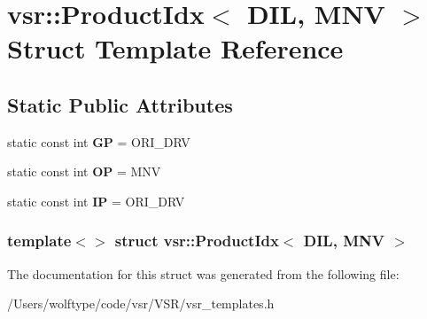 \hypertarget{structvsr_1_1_product_idx_3_01_d_i_l_00_01_m_n_v_01_4}{\section{vsr\-:\-:Product\-Idx$<$ D\-I\-L, M\-N\-V $>$ Struct Template Reference}
\label{structvsr_1_1_product_idx_3_01_d_i_l_00_01_m_n_v_01_4}
}
\subsection*{Static Public Attributes}
\begin{DoxyCompactItemize}
\item 
\hypertarget{structvsr_1_1_product_idx_3_01_d_i_l_00_01_m_n_v_01_4_a890b97ff0f5934e629fce65a089faeec}{static const int {\bfseries G\-P} = O\-R\-I\-\_\-\-D\-R\-V}\label{structvsr_1_1_product_idx_3_01_d_i_l_00_01_m_n_v_01_4_a890b97ff0f5934e629fce65a089faeec}

\item 
\hypertarget{structvsr_1_1_product_idx_3_01_d_i_l_00_01_m_n_v_01_4_a7eed7ef5671885e43fdc49044ec17a76}{static const int {\bfseries O\-P} = M\-N\-V}\label{structvsr_1_1_product_idx_3_01_d_i_l_00_01_m_n_v_01_4_a7eed7ef5671885e43fdc49044ec17a76}

\item 
\hypertarget{structvsr_1_1_product_idx_3_01_d_i_l_00_01_m_n_v_01_4_adcc879abeb4e4b9c5e8879ef89535114}{static const int {\bfseries I\-P} = O\-R\-I\-\_\-\-D\-R\-V}\label{structvsr_1_1_product_idx_3_01_d_i_l_00_01_m_n_v_01_4_adcc879abeb4e4b9c5e8879ef89535114}

\end{DoxyCompactItemize}
\subsubsection*{template$<$$>$ struct vsr\-::\-Product\-Idx$<$ D\-I\-L, M\-N\-V $>$}



The documentation for this struct was generated from the following file\-:\begin{DoxyCompactItemize}
\item 
/\-Users/wolftype/code/vsr/\-V\-S\-R/vsr\-\_\-templates.\-h\end{DoxyCompactItemize}
